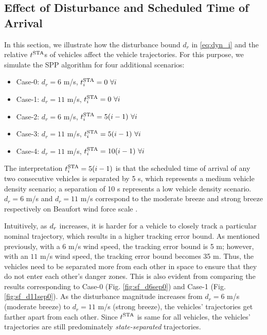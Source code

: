 \subsection{Effect of Disturbance and Scheduled Time of Arrival \label{sec:city_distbEffect}}
In this section, we illustrate how the disturbance bound $d_r$ in \eqref{eq:dyn_i} and the relative $t^\text{STA}$s of vehicles affect the vehicle trajectories. For this purpose, we simulate the SPP algorithm for four additional scenarios:
\begin{itemize}
\item Case-0: $d_r = 6$ m/s, $t^\text{STA}_i = 0 ~\forall i$
\item Case-1: $d_r = 11$ m/s, $t^\text{STA}_i = 0 ~\forall i$
\item Case-2: $d_r = 6$ m/s, $t^\text{STA}_i = 5(i-1) ~\forall i$
\item Case-3: $d_r = 11$ m/s, $t^\text{STA}_i = 5(i-1) ~\forall i$
\item Case-4: $d_r = 11$ m/s, $t^\text{STA}_i = 10(i-1) ~\forall i$
\end{itemize}
The interpretation $t^\text{STA}_i = 5(i-1)$ is that the scheduled time of arrival of any two consecutive vehicles is separated by 5 s, which represents a medium vehicle density scenario; a separation of 10 s represents a low vehicle density scenario. $d_r = 6$ m/s and $d_r = 11$ m/s correspond to the moderate breeze and strong breeze respectively on Beaufort wind force scale \cite{Windscale}. 

Intuitively, as $d_r$ increases, it is harder for a vehicle to closely track a particular nominal trajectory, which results in a higher tracking error bound. As mentioned previously, with a $6$ m/s wind speed, the tracking error bound is 5 m; however, with an $11$ m/s wind speed, the tracking error bound becomes 35 m. Thus, the vehicles need to be separated more from each other in space to ensure that they do not enter each other's danger zones. This is also evident from comparing the results corresponding to Case-0 (Fig. \ref{fig:sf_d6sep0}) and Case-1 (Fig. \ref{fig:sf_d11sep0}). As the disturbance magnitude increases from $d_r = 6$ m/s (moderate breeze) to $d_r = 11$ m/s (strong breeze), the vehicles' trajectories get farther apart from each other. Since $t^\text{STA}$ is same for all vehicles, the vehicles’ trajectories are still predominately \textit{state-separated} trajectories.

